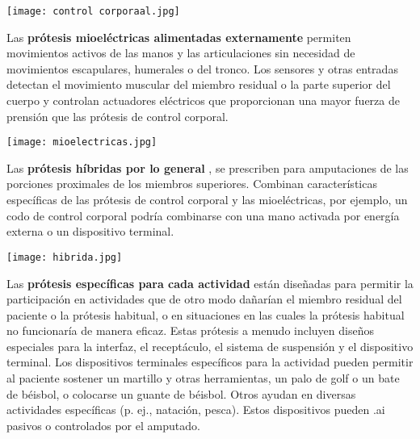 \documentclass{article}
\begin{document}
\hspace{1cm} 

\begin{minipage}{.89\linewidth}
\centering
\texttt{[image: control corporaal.jpg]}
\end{minipage}


\hspace{1cm} 


Las \textbf {prótesis mioeléctricas alimentadas externamente} permiten movimientos activos de las manos y las articulaciones sin necesidad de movimientos escapulares, humerales o del tronco. Los sensores y otras entradas detectan el movimiento muscular del miembro residual o la parte superior del cuerpo y controlan actuadores eléctricos que proporcionan una mayor fuerza de prensión que las prótesis de control corporal.

\hspace{1cm} 

\begin{minipage}{.89\linewidth}
\centering
\texttt{[image: mioelectricas.jpg]}
\end{minipage}




Las \textbf {prótesis híbridas por lo general} , se prescriben para amputaciones de las porciones proximales de los miembros superiores. Combinan características específicas de las prótesis de control corporal y las mioeléctricas, por ejemplo, un codo de control corporal podría combinarse con una mano activada por energía externa o un dispositivo terminal.

\hspace{1cm} 

\begin{minipage}{.89\linewidth}
\centering
\texttt{[image: hibrida.jpg]}
\end{minipage}


\hspace{1cm} 

Las \textbf { prótesis específicas para cada actividad} están diseñadas para permitir la participación en actividades que de otro modo dañarían el miembro residual del paciente o la prótesis habitual, o en situaciones en las cuales la prótesis habitual no funcionaría de manera eficaz. Estas prótesis a menudo incluyen diseños especiales para la interfaz, el receptáculo, el sistema de suspensión y el dispositivo terminal. Los dispositivos terminales específicos para la actividad pueden permitir al paciente sostener un martillo y otras herramientas, un palo de golf o un bate de béisbol, o colocarse un guante de béisbol. Otros ayudan en diversas actividades específicas (p. ej., natación, pesca). Estos dispositivos pueden .ai pasivos o controlados por el amputado.
\end{document}
